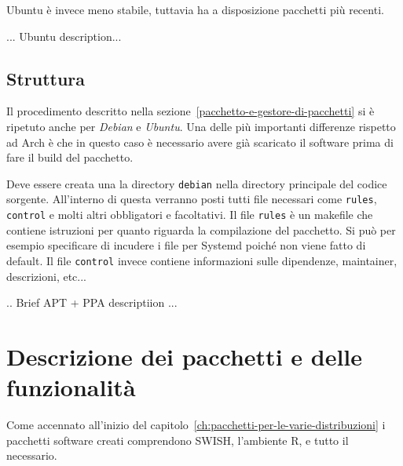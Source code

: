 \documentclass[10pt,titlepage,twoside,a4paper]{report}
\begin{document}
Ubuntu è invece meno stabile, tuttavia ha a
disposizione pacchetti più recenti.

... Ubuntu description...

\subsection{Struttura}
Il procedimento descritto nella sezione~\ref{pacchetto-e-gestore-di-pacchetti}
si è ripetuto anche per \emph{Debian} e \emph{Ubuntu}. Una delle più 
importanti differenze rispetto ad Arch è che in questo caso è necessario 
avere già scaricato il software prima di fare il build del pacchetto.

Deve essere creata una la directory \texttt{debian} nella directory principale 
del codice sorgente. All'interno di questa verranno posti tutti file 
necessari come \texttt{rules}, \texttt{control} e molti altri obbligatori e 
facoltativi. Il file \texttt{rules} è un makefile che contiene istruzioni per 
quanto riguarda la compilazione del pacchetto. Si può per esempio specificare 
di incudere i file per Systemd poiché non viene fatto di default. Il file 
\texttt{control} invece contiene informazioni sulle dipendenze, maintainer, 
descrizioni, etc... 

.. Brief APT + PPA descriptiion ...


\section{Descrizione dei pacchetti e delle funzionalità}
Come accennato all'inizio del capitolo~\ref{ch:pacchetti-per-le-varie-distribuzioni}
i pacchetti software creati comprendono SWISH, l'ambiente R, e tutto il 
necessario.
\end{document}

